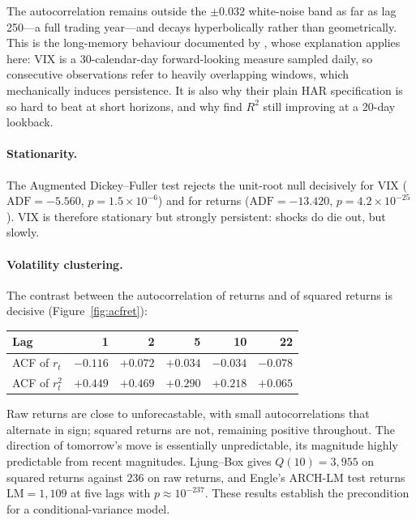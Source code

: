 \documentclass[10pt,a4paper]{article}
\begin{document}
\noindent
The autocorrelation remains outside the $\pm 0.032$ white-noise band as far as lag
250---a full trading year---and decays hyperbolically rather than geometrically. This is
the long-memory behaviour documented by \citet{fernandes2014}, whose explanation applies
here: VIX is a 30-calendar-day forward-looking measure sampled daily, so consecutive
observations refer to heavily overlapping windows, which mechanically induces
persistence. It is also why their plain HAR specification is so hard to beat at short
horizons, and why \citet{wen2024} find $R^2$ still improving at a 20-day lookback.

\paragraph{Stationarity.} The Augmented Dickey--Fuller test rejects the unit-root null
decisively for VIX ($\text{ADF} = -5.560$, $p = 1.5\times10^{-6}$) and for returns
($\text{ADF} = -13.420$, $p = 4.2\times10^{-25}$). VIX is therefore stationary but
strongly persistent: shocks do die out, but slowly.

\paragraph{Volatility clustering.} The contrast between the autocorrelation of returns
and of squared returns is decisive (Figure~\ref{fig:acfret}):

\begin{table}[H]
\centering\small
\begin{tabular}{lrrrrr}
\toprule
Lag & 1 & 2 & 5 & 10 & 22 \\
\midrule
ACF of $r_t$   & $-0.116$ & $+0.072$ & $+0.034$ & $-0.034$ & $-0.078$ \\
ACF of $r_t^2$ & $+0.449$ & $+0.469$ & $+0.290$ & $+0.218$ & $+0.065$ \\
\bottomrule
\end{tabular}
\end{table}

\noindent
Raw returns are close to unforecastable, with small autocorrelations that alternate in
sign; squared returns are not, remaining positive throughout. The direction of tomorrow's
move is essentially unpredictable, its magnitude highly predictable from recent
magnitudes. Ljung--Box gives $Q(10) = 3{,}955$ on squared returns against $236$ on raw
returns, and Engle's ARCH-LM test returns $\text{LM} = 1{,}109$ at five lags with
$p \approx 10^{-237}$. These results establish the precondition for a
conditional-variance model.
\end{document}

